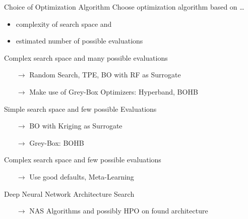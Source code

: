 \begin{frame}{Choice of Optimization Algorithm}
  Choose optimization algorithm based on \ldots
  \begin{itemize}
    \item complexity of search space and
    \item estimated number of possible evaluations
  \end{itemize}

  \vspace{0.5em}

  Complex search space and many possible evaluations 
  \begin{itemize}
    \item[$\rightarrow$] Random Search, TPE, BO with RF as Surrogate
    \item[$\rightarrow$] Make use of Grey-Box Optimizers: Hyperband, BOHB
  \end{itemize}
  Simple search space and few possible Evaluations 
  \begin{itemize}
    \item[$\rightarrow$] BO with Kriging as Surrogate
    \item[$\rightarrow$] Grey-Box: BOHB
  \end{itemize}
  Complex search space and few possible evaluations
  \begin{itemize}
    \item[$\rightarrow$]Use good defaults, Meta-Learning
  \end{itemize}
  Deep Neural Network Architecture Search 
  \begin{itemize}
    \item[$\rightarrow$]NAS Algorithms and possibly HPO on found architecture
  \end{itemize}

\end{frame}



